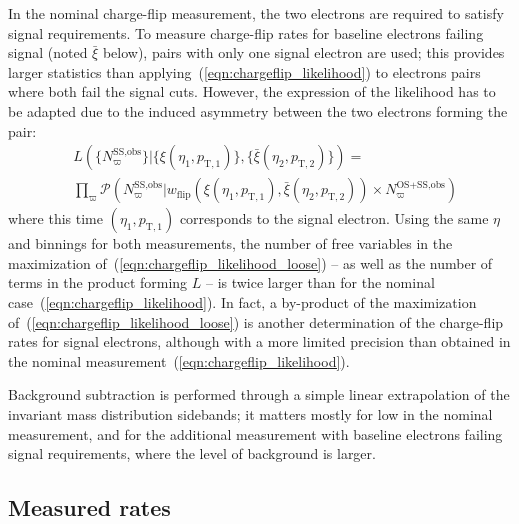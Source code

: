 In the nominal charge-flip measurement, the two electrons are required to satisfy signal requirements. 
To measure charge-flip rates for baseline electrons failing signal (noted $\bar\xi$ below), 
pairs with only one signal electron are used; 
this provides larger statistics than applying~(\ref{eqn:chargeflip_likelihood}) to electrons pairs where both fail the signal cuts. 
However, the expression of the likelihood has to be adapted due to the induced asymmetry between the two electrons forming the pair: 
\begin{equation}
\begin{aligned}
{} & L(\{N^\text{SS,obs}_\varpi\}|\{\xi(\eta_1,p_{\mathrm{T},1})\},\{\bar\xi(\eta_2,p_{\mathrm{T},2})\}) 
= \\
& \prod_{\varpi} \mathcal P\left(N^\text{SS,obs}_\varpi|w_\text{flip}(\xi(\eta_1,p_{\mathrm{T},1}),\bar\xi(\eta_2,p_{\mathrm{T},2}))\times N^\text{OS+SS,obs}_\varpi\right)
\label{eqn:chargeflip_likelihood_loose}
\end{aligned}%
\end{equation}
where this time $(\eta_1,p_{\mathrm{T},1})$ corresponds to the signal electron. 
Using the same $\eta$ and \pt binnings for both measurements, 
the number of free variables in the maximization of~(\ref{eqn:chargeflip_likelihood_loose}) 
-- as well as the number of terms in the product forming $L$ -- 
is twice larger than for the nominal case~(\ref{eqn:chargeflip_likelihood}). 
In fact, a by-product of the maximization of~(\ref{eqn:chargeflip_likelihood_loose}) is another determination of the charge-flip rates for signal electrons, 
although with a more limited precision than obtained in the nominal measurement~(\ref{eqn:chargeflip_likelihood}).

Background subtraction is performed through a simple linear extrapolation of the invariant mass distribution sidebands; 
it matters mostly for low \pt in the nominal measurement, 
and for the additional measurement with baseline electrons failing signal requirements, where the level of background is larger. 

\subsection*{Measured rates}
\label{subsec:chargeflip_rates}

